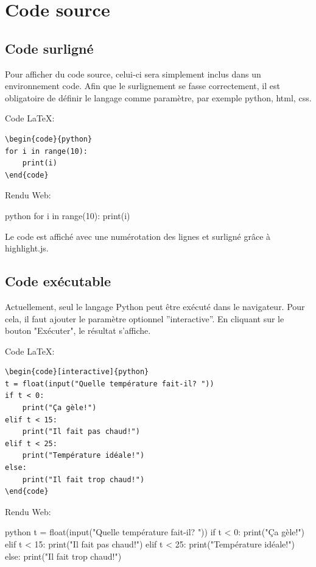 \documentclass[a4paper,11pt]{article}
\begin{document}
\section{Code source}
\subsection{Code surligné}
Pour afficher du code source, celui-ci sera simplement inclus dans un environnement code. Afin que le surlignement se fasse correctement, il est obligatoire de définir le langage comme paramètre, par exemple python, html, css.\par

Code LaTeX:
\begin{lstlisting}
\begin{code}{python}
for i in range(10):
    print(i)
\end{code}
\end{lstlisting}

Rendu Web:\par
\begin{code}{python}
for i in range(10):
    print(i)
\end{code}

Le code est affiché avec une numérotation des lignes et surligné grâce à highlight.js.

\subsection{Code exécutable}
Actuellement, seul le langage Python peut être exécuté dans le navigateur. Pour cela, il faut ajouter le paramètre optionnel ”interactive”. En cliquant sur le bouton "Exécuter", le résultat s'affiche.\par

Code LaTeX:
\begin{lstlisting}
\begin{code}[interactive]{python}
t = float(input("Quelle température fait-il? "))
if t < 0:
    print("Ça gèle!")
elif t < 15:
    print("Il fait pas chaud!")
elif t < 25:
    print("Température idéale!")
else:
    print("Il fait trop chaud!")
\end{code}
\end{lstlisting}

Rendu Web:\par
\begin{code}[interactive]{python}
t = float(input("Quelle température fait-il? "))
if t < 0:
    print("Ça gèle!")
elif t < 15:
    print("Il fait pas chaud!")
elif t < 25:
    print("Température idéale!")
else:
    print("Il fait trop chaud!")
\end{code}
\end{document}
